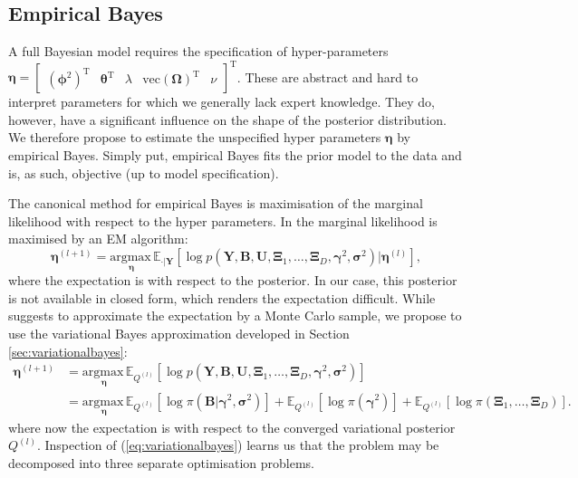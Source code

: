 \documentclass[a4paper,hidelinks]{article}\usepackage[]{graphicx}\usepackage[]{color}
\newcommand{\bsigma}{\bm{\sigma}}
\newcommand{\Y}{\mathbf{Y}}
\newcommand{\bgamma}{\bm{\gamma}}
\newcommand{\B}{\mathbf{B}}
\newcommand{\U}{\mathbf{U}}
\newcommand{\0}{\bm{0}}
\newcommand{\argmax}{\text{argmax} \,}
\newcommand{\E}{\mathbb{E}}
\newcommand{\tr}{^{\text{T}}}
\renewcommand{\(}{\left(}
\renewcommand{\)}{\right)}
\renewcommand{\[}{\left[}
\renewcommand{\]}{\right]}
\begin{document}
	\subsection{Empirical Bayes}\label{sec:empiricalbayes}
	A full Bayesian model requires the specification of hyper-parameters $\bm{\eta} = \begin{bmatrix} (\bm{\phi}^2) \tr & \bm{\theta} \tr & \lambda & \text{vec}(\bm{\Omega}) \tr & \nu \end{bmatrix} \tr$. These are abstract and hard to interpret parameters for which we generally lack expert knowledge. They do, however, have a significant influence on the shape of the posterior distribution. We therefore propose to estimate the unspecified hyper parameters $\bm{\eta}$ by empirical Bayes. Simply put, empirical Bayes fits the prior model to the data and is, as such, objective (up to model specification). 
	
	The canonical method for empirical Bayes is maximisation of the marginal likelihood with respect to the hyper parameters. In \cite{casella_empirical_2001} the marginal likelihood is maximised by an EM algorithm:
	$$
	\bm{\eta}^{(l+1)} = \underset{\bm{\eta}}{\argmax}\E_{\cdot | \Y} [\log p(\Y, \B, \U, \bm{\Xi}_1, \dots, \bm{\Xi}_D, \bgamma^2, \bsigma^2) | \bm{\eta}^{(l)}],
	$$
	where the expectation is with respect to the posterior. In our case, this posterior is not available in closed form, which renders the expectation difficult. While \cite{casella_empirical_2001} suggests to approximate the expectation by a Monte Carlo sample, we propose to use the variational Bayes approximation developed in Section \ref{sec:variationalbayes}:
	\begin{align}\label{eq:variationalbayes}
	\bm{\eta}^{(l+1)} & = \underset{\bm{\eta}}{\argmax}\E_{Q^{(l)}} [\log p(\Y, \B, \U, \bm{\Xi}_1, \dots, \bm{\Xi}_D, \bgamma^2, \bsigma^2)] \nonumber \\
	& = \underset{\bm{\eta}}{\argmax} \E_{Q^{(l)}} [\log \pi (\B | \bgamma^2, \bsigma^2)] + \E_{Q^{(l)}} [\log \pi (\bgamma^2)] + \E_{Q^{(l)}} [\log \pi (\bm{\Xi}_1, \dots, \bm{\Xi}_D)].
	\end{align}
	where now the expectation is with respect to the converged variational posterior $Q^{(l)}$. Inspection of (\ref{eq:variationalbayes}) learns us that the problem may be decomposed into three separate optimisation problems.
	
\end{document}
